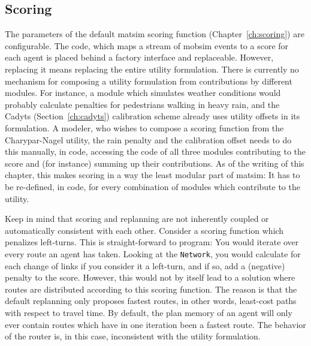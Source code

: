 \subsection{Scoring}
\label{sec:scoring-extension-point}
The parameters of the default \gls{matsim} scoring function (Chapter~\ref{ch:scoring}) are configurable. The code, which maps a stream of \gls{mobsim} \glspl{event} to a \gls{score} for each agent is placed behind a factory interface and replaceable. However, replacing it means replacing the entire utility formulation. There is currently no mechanism for composing a utility formulation from contributions by different modules. For instance, a module which simulates weather conditions would probably calculate penalties for pedestrians walking in heavy rain, and the Cadyts (Section~\ref{ch:cadyts}) calibration scheme already uses utility offsets in its formulation. A modeler, who wishes to compose a scoring function from the Charypar-Nagel utility, the rain penalty and the calibration offset needs to do this manually, in code, accessing the code of all three modules contributing to the score and (for instance) summing up their contributions. As of the writing of this chapter, this makes scoring in a way the least modular part of \gls{matsim}: It has to be re-defined, in code, for every combination of \glspl{module} which contribute to the utility.

Keep in mind that \gls{scoring} and \gls{replanning} are not inherently coupled or automatically consistent with each other. Consider a scoring function which penalizes left-turns. This is straight-forward to program: You would iterate over every route an agent has taken. Looking at the \lstinline|Network|, you would calculate for each change of links if you consider it a left-turn, and if so, add a (negative) penalty to the score. However, this would not by itself lead to a solution where routes are distributed according to this scoring function. The reason is that the default \gls{replanning} only proposes fastest routes, in other words, least-cost paths with respect to travel time. By default, the plan memory of an agent will only ever contain routes which have in one iteration been a fastest route. The behavior of the router is, in this case, inconsistent with the utility formulation.
   

